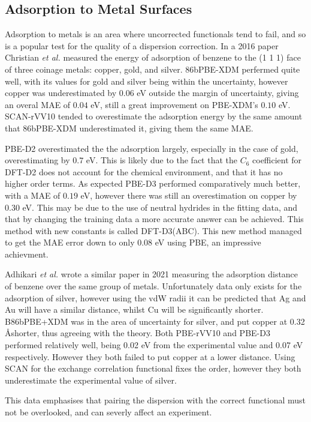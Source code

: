 \documentclass[10pt,a4paper,twocolumn,twoside]{extarticle}
\newcommand{\al}{\emph{et al. }}
\newcommand{\oA}{\si{\angstrom}}
\begin{document}
	\subsection{Adsorption to Metal Surfaces}
	Adsorption to metals is an area where uncorrected functionals tend to fail, and so is a popular test for the quality of a dispersion correction. In a 2016 paper Christian \al measured\cite{Christian2016-CoinageAdsorption} the energy of adsorption of benzene to the (1 1 1) face of three coinage metals: copper, gold, and silver. 86bPBE-XDM perfermed quite well, with its values for gold and silver being within the uncertainty, however copper was underestimated by $0.06$ eV outside the margin of uncertainty, giving an overal MAE of  $0.04$ eV, still a great improvement on PBE-XDM's $0.10$ eV. SCAN-rVV10 tended to overestimate the adsorption energy by the same amount that 86bPBE-XDM underestimated it, giving them the same MAE. 

	PBE-D2 overestimated the the adsorption largely, especially in the case of gold, overestimating by $0.7$ eV. This is likely due to the fact that the $C_6$ coefficient for DFT-D2 does not account for the chemical environment, and that it has no higher order terms. As expected PBE-D3 performed comparatively much better, with a MAE of $0.19$ eV, however there was still an overestimation on copper by $0.30$ eV. This may be due to the use of neutral hydrides in the fitting data, and that by changing the training data a more accurate answer can be achieved. \cite{D3-ABC} This method with new constants is called DFT-D3(ABC). This new method managed to get the MAE error down to only $0.08$ eV using PBE, an impressive achievment.

	Adhikari \al wrote a similar paper in 2021 \cite{VV10-Adsorption} measuring the adsorption distance of benzene over the same group of metals. Unfortunately data only exists for the adsorption of silver, however using the vdW radii it can be predicted that Ag and Au will have a similar distance, whilst Cu will be significantly shorter. B86bPBE+XDM was in the area of uncertainty for silver, and put copper at 0.32 \oA shorter, thus agreeing with the theory. Both PBE-rVV10 and PBE-D3 performed relatively well, being 0.02 eV from the experimental value and 0.07 eV respectively. However they both failed to put copper at a lower distance. Using SCAN for the exchange correlation functional fixes the order, however they both underestimate the experimental value of silver. 

	This data emphasises that pairing the dispersion with the correct functional must not be overlooked, and can severly affect an experiment. 
\end{document}
